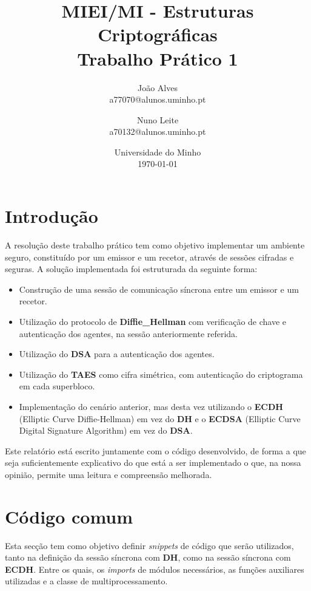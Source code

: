 \documentclass[11pt]{article}
\title{MIEI/MI - Estruturas Criptográficas\\
            \large Trabalho Prático 1}
\author{
        João Alves \\
        a77070@alunos.uminho.pt
        \and
        Nuno Leite \\
        a70132@alunos.uminho.pt
    }
\date{
        Universidade do Minho\\
        \today
    }
\providecommand{\tightlist}{%
      \setlength{\itemsep}{0pt}\setlength{\parskip}{0pt}}
\begin{document}
    
    
    \maketitle
    

    \hypertarget{introduuxe7uxe3o}{%
\section{Introdução}\label{introduuxe7uxe3o}}

    A resolução deste trabalho prático tem como objetivo implementar um
ambiente seguro, constituído por um emissor e um recetor, através de
sessões cifradas e seguras. A solução implementada foi estruturada da
seguinte forma:

\begin{itemize}
\tightlist
\item
  Construção de uma sessão de comunicação síncrona entre um emissor e um
  recetor.
\item
  Utilização do protocolo de \textbf{Diffie\_Hellman} com verificação de
  chave e autenticação dos agentes, na sessão anteriormente referida.
\item
  Utilização do \textbf{DSA} para a autenticação dos agentes.
\item
  Utilização do \textbf{TAES} como cifra simétrica, com autenticação do
  criptograma em cada superbloco.
\item
  Implementação do cenário anterior, mas desta vez
  utilizando o \textbf{ECDH} (Elliptic Curve Diffie-Hellman) em vez do
  \textbf{DH} e o \textbf{ECDSA} (Elliptic Curve Digital Signature
  Algorithm) em vez do \textbf{DSA}.
\end{itemize}

Este relatório está escrito juntamente com o
código desenvolvido, de forma a que seja suficientemente explicativo do que está a ser
implementado o que, na nossa opinião, permite uma leitura e compreensão
melhorada.

    \hypertarget{cuxf3digo-comum}{%
\section{Código comum}\label{cuxf3digo-comum}}

    Esta secção tem como objetivo definir \emph{snippets} de código que
serão utilizados, tanto na definição da sessão síncrona com \textbf{DH},
como na sessão síncrona com \textbf{ECDH}. Entre os quais, os \emph{imports}
de módulos necessários, as funções auxiliares utilizadas e a classe de
multiprocessamento.
\end{document}
